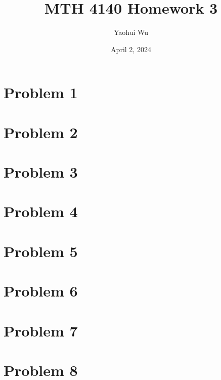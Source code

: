\documentclass[12pt]{article}
\title{MTH 4140 Homework 3}
\author{Yaohui Wu}
\date{April 2, 2024}
\begin{document}
\maketitle
\section*{Problem 1}
\section*{Problem 2}
\section*{Problem 3}
\section*{Problem 4}
\section*{Problem 5}
\section*{Problem 6}
\section*{Problem 7}
\section*{Problem 8}
\end{document}
